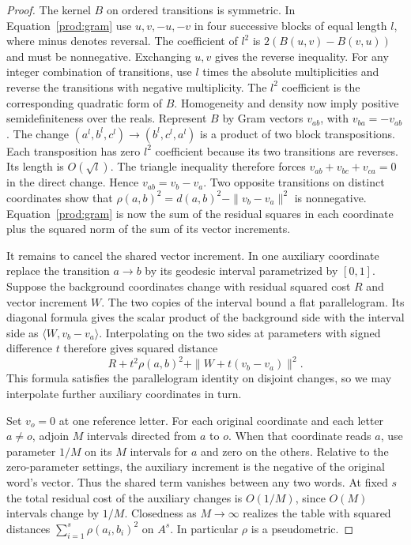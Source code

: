 \begin{proof}
The kernel $B$ on ordered transitions is symmetric. In
Equation~\eqref{prod:gram} use $u,v,-u,-v$ in four successive blocks of equal
length $l$, where minus denotes reversal. The coefficient of $l^2$ is
$2(B(u,v)-B(v,u))$ and must be nonnegative. Exchanging $u,v$ gives the
reverse inequality. For any integer combination of transitions, use $l$
times the absolute multiplicities and reverse the transitions with negative
multiplicity. The $l^2$ coefficient is the corresponding quadratic form
of $B$. Homogeneity and density now imply positive semidefiniteness over
the reals. Represent $B$ by Gram vectors $v_{ab}$, with $v_{ba}=-v_{ab}$.
The change $(a^l,b^l,c^l)\to(b^l,c^l,a^l)$ is a product of two
block transpositions. Each transposition has zero $l^2$ coefficient
because its two transitions are reverses. Its length is $O(\sqrt l)$.
The triangle inequality therefore forces
$v_{ab}+v_{bc}+v_{ca}=0$ in the direct change. Hence $v_{ab}=v_b-v_a$.
Two opposite transitions on distinct coordinates show that
$\rho(a,b)^2=d(a,b)^2-\|v_b-v_a\|^2$ is nonnegative. Equation~\eqref{prod:gram} is now the sum of the residual squares in each coordinate
plus the squared norm of the sum of its vector increments.

It remains to cancel the shared vector increment. In one auxiliary
coordinate replace the transition $a\to b$ by its geodesic interval
parametrized by $[0,1]$. Suppose the background coordinates change with
residual squared cost $R$ and vector increment $W$. The two copies of
the interval bound a flat parallelogram. Its diagonal formula gives
the scalar product of the background side with the interval side as
$\langle W,v_b-v_a\rangle$. Interpolating on the two sides at parameters
with signed difference $t$ therefore gives squared distance
\[
 R+t^2\rho(a,b)^2+\|W+t(v_b-v_a)\|^2 .
\]
This formula satisfies the parallelogram identity on disjoint changes,
so we may interpolate further auxiliary coordinates in turn.

Set $v_o=0$ at one reference letter. For each original coordinate and
each letter $a\ne o$, adjoin $M$ intervals directed from $a$ to $o$.
When that coordinate reads $a$, use parameter $1/M$ on its $M$
intervals for $a$ and zero on the others. Relative to the zero-parameter
settings, the auxiliary increment is the negative of the original
word's vector. Thus the shared term vanishes between any two words. At fixed $s$ the total
residual cost of the auxiliary changes is $O(1/M)$, since $O(M)$
intervals change by $1/M$. Closedness as $M\to\infty$ realizes the
table with squared distances $\sum_{i=1}^s\rho(a_i,b_i)^2$ on $A^s$.
In particular $\rho$ is a pseudometric.

\end{proof}

